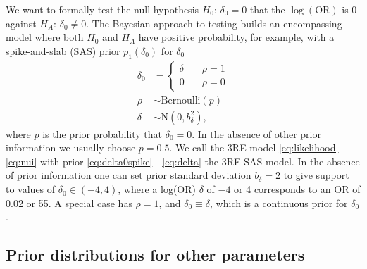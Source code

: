 \documentclass[AMA,STIX1COL]{WileyNJD-v2}
\begin{document}
We want to formally test the null hypothesis $H_0{:\,} \delta_0 = 0$ that the $\log(\mbox{OR})$ is 0 against $H_A{:\,} \delta_0 \ne 0$. The Bayesian approach to testing builds an encompassing model where both $H_0$ and $H_A$ have positive probability, for example, with a spike-and-slab (SAS) prior $p_1(\delta_0)$ for $\delta_0$
\begin{align}
\delta_0 & = \left\{
		\begin{array}{ll}
			\delta &\quad \rho = 1 \\
			0 &\quad \rho = 0
		\end{array}
		\right. \label{eq:delta0spike}\\
\rho &\sim \mbox{Bernoulli}(p) \label{eq:spike} \\
\delta &\sim \mbox{N}(0, b_\delta^2), \label{eq:delta}
\end{align}
\noindent where $p$ is the prior probability that $\delta_0 = 0$. In the absence of other prior information we usually choose $p = 0.5$. We call the 3RE model \eqref{eq:likelihood} - \eqref{eq:nui} with prior \eqref{eq:delta0spike} - \eqref{eq:delta} the 3RE-SAS model. In the absence of prior information one can set prior standard deviation $b_\delta = 2$ to give support to values of $\delta_0 \in (-4, 4)$, where a log(OR) $\delta$ of $-4$ or 4 corresponds to an OR of 0.02 or 55. A special case has $\rho = 1$, and $\delta_0 \equiv \delta$, which is a continuous prior for $\delta_0$.

\subsection{Prior distributions for other parameters} \label{sec:priors}
\end{document}
